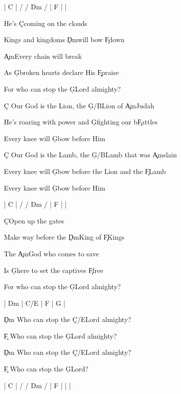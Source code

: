 \documentclass[9pt]{extarticle}
\begin{document}
\bsong

\bi[2]
| C |  / / Dm /  | F |  |
\ei

\bv
He's \c{C}coming on the clouds

Kings and kingdoms \c{Dm}will bow \c{F}down

\c{Am}Every chain will break

As \c{G}broken hearts declare His \c{F}praise

For who can stop the \c{G}Lord almighty?
\ev

\bc
\c{C} Our God is the Lion, the \c{G/B}Lion of \c{Am}Judah

He’s roaring with power and \c{G}fighting our b\c{F}attles

Every knee will \c{G}bow before Him

\c{C} Our God is the Lamb, the \c{G/B}Lamb that was \c{Am}slain


Every knee will \c{G}bow before the Lion and the \c{F}Lamb

Every knee will \c{G}bow before Him
\ec

\bin[2]
| C |  / / Dm /  | F |  |
\ein

\bv
\c{C}Open up the gates

Make way before the \c{Dm}King of \c{F}Kings

The \c{Am}God who comes to save

Is \c{G}here to set the captives \c{F}free

For who can stop the \c{G}Lord almighty?
\ev


\bin
| Dm |  C/E  | F | G |
\ein

\bb[3]
\c{Dm} Who can stop the \c{C/E}Lord almighty?

\c{F} Who can stop the \c{G}Lord almighty?
\eb

\bb
\c{Dm} Who can stop the \c{C/E}Lord almighty?

\c{F} Who can stop the \c{G}Lord?
\eb


\bo[2]
| C |  / / Dm /  | F |  |  |
\eo

\esong
\end{document}
